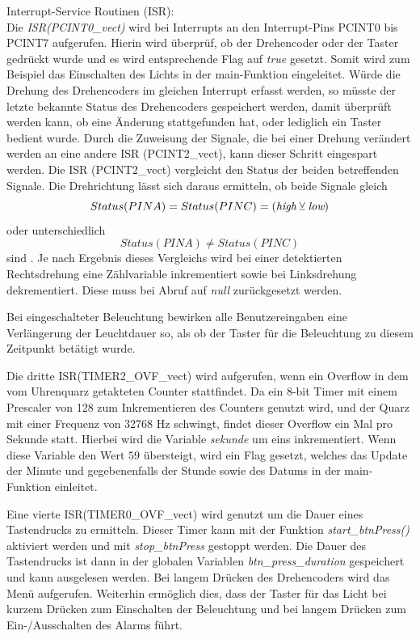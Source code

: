 \documentclass[journal, a4paper]{IEEEtran}
\begin{document}
	Interrupt-Service Routinen (ISR):\\
	Die \emph{ISR(PCINT0\_vect)} wird bei Interrupts an den Interrupt-Pins PCINT0 bis PCINT7 aufgerufen. Hierin wird überprüf, ob der Drehencoder oder der Taster gedrückt wurde und es wird entsprechende Flag auf \emph{true} gesetzt. Somit wird zum Beispiel das Einschalten des Lichts in der main-Funktion eingeleitet.
	Würde die Drehung des Drehencoders im gleichen Interrupt erfasst werden, so müsste der letzte bekannte Status des Drehencoders gespeichert werden, damit überprüft werden kann, ob eine Änderung stattgefunden hat, oder lediglich ein Taster bedient wurde. Durch die Zuweisung der Signale, die bei einer Drehung verändert werden an eine andere ISR (PCINT2\_vect), kann dieser Schritt eingespart werden. Die ISR (PCINT2\_vect) vergleicht den Status der beiden betreffenden Signale. Die Drehrichtung lässt sich daraus ermitteln, ob beide Signale gleich 
	\begin{equation}
		Status(PINA) = Status(PINC) = (\emph{high} \veebar \emph{low})
	\end{equation} oder unterschiedlich 
	\begin{equation}
		Status(PINA) \neq Status(PINC)
	\end{equation}
	 sind \cite{STEC11B}. Je nach Ergebnis dieses Vergleichs wird bei einer detektierten Rechtsdrehung eine Zählvariable inkrementiert sowie bei Linksdrehung dekrementiert. Diese muss bei Abruf auf \emph{null} zurückgesetzt werden.\par 
	Bei eingeschalteter Beleuchtung bewirken alle Benutzereingaben eine Verlängerung der Leuchtdauer so, als ob der Taster für die Beleuchtung zu diesem Zeitpunkt betätigt wurde.\par
	Die dritte ISR(TIMER2\_OVF\_vect) wird aufgerufen, wenn ein Overflow in dem vom Uhrenquarz getakteten Counter stattfindet. Da ein 8-bit Timer mit einem Prescaler von 128 zum Inkrementieren des Counters genutzt wird, und der Quarz mit einer Frequenz von 32768 Hz schwingt, findet dieser Overflow ein Mal pro Sekunde statt. Hierbei wird die Variable \emph{sekunde} um eins inkrementiert. Wenn diese Variable den Wert $59$ übersteigt, wird ein Flag gesetzt, welches das Update der Minute und gegebenenfalls der Stunde sowie des Datums in der main-Funktion einleitet.\par
	Eine vierte ISR(TIMER0\_OVF\_vect) wird genutzt um die Dauer eines Tastendrucks zu ermitteln. Dieser Timer kann mit der Funktion \emph{start\_btnPress()} aktiviert werden und mit \emph{stop\_btnPress} gestoppt werden. Die Dauer des Tastendrucks ist dann in der globalen Variablen \emph{btn\_press\_duration} gespeichert und kann ausgelesen werden. Bei langem Drücken des Drehencoders wird das Menü aufgerufen. Weiterhin ermöglich dies, dass der Taster für das Licht bei kurzem Drücken zum Einschalten der Beleuchtung und bei langem Drücken zum Ein-/Ausschalten des Alarms führt. 
	
\end{document}
